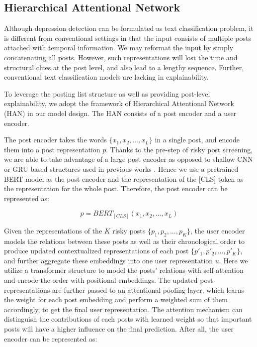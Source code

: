 \subsection{Hierarchical Attentional Network}
\label{sec:HAN}

Although depression detection can be formulated as text classification problem, it is different from conventional settings in that the input consists of multiple posts attached with temporal information. We may reformat the input by simply concatenating all posts. However, such representations will lost the time and structural clues at the post level, and also lead to a lengthy sequence. Further, conventional text classification models are lacking in explainability. 

To leverage the posting list structure as well as providing post-level explainability, we adopt the framework of Hierarchical Attentional Network (HAN) \cite{yang2016hierarchical} in our model design. The HAN consists of a post encoder and a user encoder. 

The post encoder takes the words $\{x_1, x_2, ..., x_L\}$ in a single post, and encode them into a post representation $p$. Thanks to the pre-step of risky post screening, we are able to take advantage of a large post encoder as opposed to shallow CNN or GRU based structures used in previous works \cite{yates2017depression,zogan2021explainable}. Hence we use a pretrained BERT model as the post encoder and the representation of the [CLS] token as the representation for the whole post. Therefore, the post encoder can be represented as: 

\begin{equation}
    p = BERT_{[CLS]}(x_1, x_2, ..., x_L)
\end{equation}

Given the representations of the $K$ risky posts $\{p_1, p_2, ..., p_K\}$, the user encoder models the relations between these posts as well as their chronological order to produce updated contextualized representations of each post $\{p'_1, p'_2, ..., p'_K\}$, and further aggregate these embeddings into one user representation $u$. Here we utilize a transformer structure to model the posts' relations with self-attention and encode the order with positional embeddings. The updated post representations are further passed to an attentional pooling layer, which learns the weight for each post embedding and perform a weighted sum of them accordingly, to get the final user representation. The attention mechanism can distinguish the contributions of each posts with learned weight so that important posts will have a higher influence on the final prediction. After all, the user encoder can be represented as:

